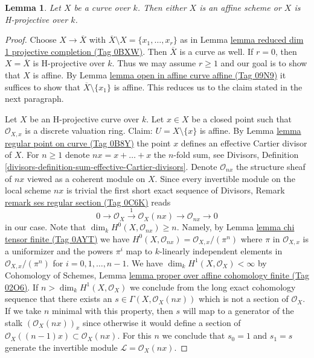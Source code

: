 \documentclass{amsart}
\theoremstyle{plain}
\newtheorem{lemma}[subsection]{Lemma}
\theoremstyle{definition}
\theoremstyle{remark}
\numberwithin{equation}{subsection}
\begin{document}
\begin{lemma}
\label{lemma-curve-affine-projective}
Let $X$ be a curve over $k$. Then either $X$ is an affine scheme or $X$
is H-projective over $k$.
\end{lemma}

\begin{proof}
Choose $X \to \overline{X}$ with
$\overline{X} \setminus X = \{x_1, \ldots, x_r\}$ as in
Lemma \href{https://stacks.math.columbia.edu/tag/0BXW}{lemma reduced dim 1 projective completion (Tag 0BXW)}.
Then $\overline{X}$ is a curve as well.
If $r = 0$, then $X = \overline{X}$ is H-projective over $k$.
Thus we may assume $r \geq 1$ and our goal is to show that
$X$ is affine. By Lemma \href{https://stacks.math.columbia.edu/tag/09N9}{lemma open in affine curve affine (Tag 09N9)}
it suffices to show that $\overline{X} \setminus \{x_1\}$ is affine.
This reduces us to the claim stated in the next paragraph.

\medskip\noindent
Let $X$ be an H-projective curve over $k$. Let $x \in X$ be a closed point
such that $\mathcal{O}_{X, x}$ is a discrete valuation ring. Claim:
$U = X \setminus \{x\}$ is affine. By Lemma \href{https://stacks.math.columbia.edu/tag/0B8Y}{lemma regular point on curve (Tag 0B8Y)}
the point $x$ defines an effective Cartier divisor of $X$.
For $n \geq 1$ denote $nx = x + \ldots + x$ the $n$-fold sum, see
Divisors, Definition \ref{divisors-definition-sum-effective-Cartier-divisors}.
Denote $\mathcal{O}_{nx}$ the structure sheaf of $nx$ viewed as a
coherent module on $X$.
Since every invertible module on the local scheme $nx$ is trivial
the first short exact sequence of
Divisors, Remark \href{https://stacks.math.columbia.edu/tag/0C6K}{remark ses regular section (Tag 0C6K)}
reads
$$
0 \to \mathcal{O}_X
\xrightarrow{1} \mathcal{O}_X(nx) \to \mathcal{O}_{nx} \to 0
$$
in our case. Note that $\dim_k H^0(X, \mathcal{O}_{nx}) \geq n$.
Namely, by Lemma \href{https://stacks.math.columbia.edu/tag/0AYT}{lemma chi tensor finite (Tag 0AYT)} we have
$H^0(X, \mathcal{O}_{nx}) = \mathcal{O}_{X, x}/(\pi^n)$ where $\pi$ in
$\mathcal{O}_{X, x}$ is a uniformizer and the powers $\pi^i$ map to
$k$-linearly independent elements in $\mathcal{O}_{X, x}/(\pi^n)$
for $i = 0, 1, \ldots, n - 1$. We have $\dim_k H^1(X, \mathcal{O}_X) < \infty$
by Cohomology of Schemes, Lemma
\href{https://stacks.math.columbia.edu/tag/02O6}{lemma proper over affine cohomology finite (Tag 02O6)}.
If $n > \dim_k H^1(X, \mathcal{O}_X)$
we conclude from the long exact cohomology sequence
that there exists an $s \in \Gamma(X, \mathcal{O}_X(nx))$
which is not a section of $\mathcal{O}_X$.
If we take $n$ minimal with this property, then $s$ will
map to a generator of the stalk
$\left(\mathcal{O}_X(nx)\right)_x$ since otherwise it would
define a section of $\mathcal{O}_X((n - 1)x) \subset \mathcal{O}_X(nx)$.
For this $n$ we conclude that $s_0 = 1$ and $s_1 = s$
generate the invertible module $\mathcal{L} = \mathcal{O}_X(nx)$.


\end{proof}
\end{document}
